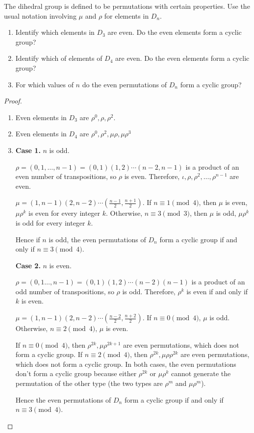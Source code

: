 \begin{exercise}
    The dihedral group is defined to be permutations with certain properties. Use the usual notation involving $\mu$ and $\rho$ for elements in $D_{n}$.
    \begin{enumerate}[label={\textbf{\alph*.}}]
        \item Identify which elements in $D_{3}$ are even. Do the even elements form a cyclic group?
        \item Identify which of elements of $D_{4}$ are even. Do the even elements form a cyclic group?
        \item For which values of $n$ do the even permutations of $D_{n}$ form a cyclic group?
    \end{enumerate}
\end{exercise}

\begin{proof}
    \begin{enumerate}[label={\textbf{\alph*.}}]
        \item Even elements in $D_{3}$ are $\rho^{0}, \rho, \rho^{2}$.
        \item Even elements in $D_{4}$ are $\rho^{0}, \rho^{2}, \mu\rho, \mu\rho^{3}$
        \item \textbf{Case 1.} $n$ is odd.

              $\rho = (0,1,\ldots,n-1) = (0,1)(1,2)\cdots(n-2,n-1)$ is a product of an even number of transpositions, so $\rho$ is even. Therefore, $\iota, \rho, \rho^{2}, \ldots, \rho^{n-1}$ are even.

              $\mu = (1,n-1)(2,n-2)\cdots (\frac{n-1}{2},\frac{n+1}{2})$. If $n\equiv 1\pmod{4}$, then $\mu$ is even, $\mu\rho^{k}$ is even for every integer $k$. Otherwise, $n\equiv 3\pmod{3}$, then $\mu$ is odd, $\mu\rho^{k}$ is odd for every integer $k$.

              Hence if $n$ is odd, the even permutations of $D_{n}$ form a cyclic group if and only if $n\equiv 3\pmod{4}$.

              \textbf{Case 2.} $n$ is even.

              $\rho = (0,1\ldots,n-1) = (0,1)(1,2)\cdots (n-2)(n-1)$ is a product of an odd number of transpositions, so $\rho$ is odd. Therefore, $\rho^{k}$ is even if and only if $k$ is even.

              $\mu = (1,n-1)(2,n-2)\cdots(\frac{n-2}{2},\frac{n+2}{2})$. If $n\equiv 0\pmod{4}$, $\mu$ is odd. Otherwise, $n\equiv 2\pmod{4}$, $\mu$ is even.

              If $n\equiv 0\pmod{4}$, then $\rho^{2k}, \mu\rho^{2k+1}$ are even permutations, which does not form a cyclic group. If $n\equiv 2\pmod{4}$, then $\rho^{2k}, \mu\rho\rho^{2k}$ are even permutations, which does not form a cyclic group. In both cases, the even permutations don't form a cyclic group because either $\rho^{2k}$ or $\mu\rho^{k}$ cannot generate the permutation of the other type (the two types are $\rho^{m}$ and $\mu\rho^{m}$).

              Hence the even permutations of $D_{n}$ form a cyclic group if and only if $n\equiv 3\pmod{4}$.
    \end{enumerate}
\end{proof}

